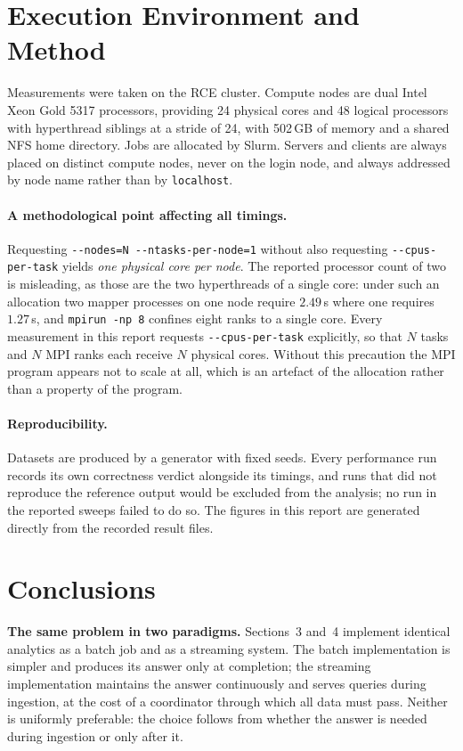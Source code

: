 \documentclass[11pt,a4paper]{article}
\begin{document}
\section{Execution Environment and Method}

Measurements were taken on the RCE cluster. Compute nodes are dual Intel Xeon Gold 5317
processors, providing 24 physical cores and 48 logical processors with hyperthread
siblings at a stride of 24, with 502\,GB of memory and a shared NFS home directory.
Jobs are allocated by Slurm. Servers and clients are always placed on distinct compute
nodes, never on the login node, and always addressed by node name rather than by
\texttt{localhost}.

\paragraph{A methodological point affecting all timings.}
Requesting \texttt{-{}-nodes=N -{}-ntasks-per-node=1} without also requesting
\texttt{-{}-cpus-per-task} yields \emph{one physical core per node}. The reported
processor count of two is misleading, as those are the two hyperthreads of a single
core: under such an allocation two mapper processes on one node require $2.49$\,s where
one requires $1.27$\,s, and \texttt{mpirun -np 8} confines eight ranks to a single core.
Every measurement in this report requests \texttt{-{}-cpus-per-task} explicitly, so that
$N$ tasks and $N$ MPI ranks each receive $N$ physical cores. Without this precaution the
MPI program appears not to scale at all, which is an artefact of the allocation rather
than a property of the program.

\paragraph{Reproducibility.} Datasets are produced by a generator with fixed seeds.
Every performance run records its own correctness verdict alongside its timings, and
runs that did not reproduce the reference output would be excluded from the analysis;
no run in the reported sweeps failed to do so. The figures in this report are generated
directly from the recorded result files.

\section{Conclusions}

\textbf{The same problem in two paradigms.} Sections~3 and~4 implement identical
analytics as a batch job and as a streaming system. The batch implementation is simpler
and produces its answer only at completion; the streaming implementation maintains the
answer continuously and serves queries during ingestion, at the cost of a coordinator
through which all data must pass. Neither is uniformly preferable: the choice follows
from whether the answer is needed during ingestion or only after it.
\end{document}
